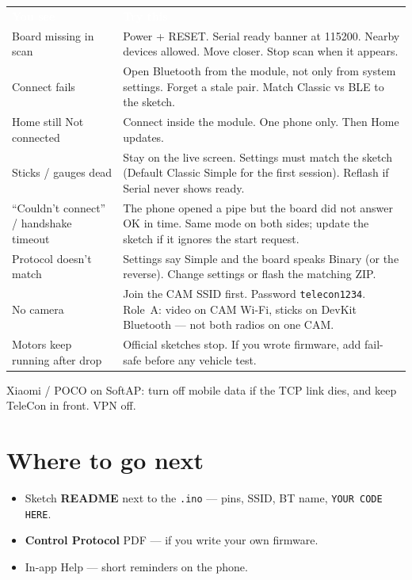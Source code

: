 \documentclass[12pt,a4paper]{article}
\newcommand{\thc}[1]{\textcolor{white}{\bfseries #1}}
\begin{document}
\begin{center}
\renewcommand{\arraystretch}{1.2}
\begin{tabular}{>{\raggedright\arraybackslash}p{3.7cm}
                >{\raggedright\arraybackslash}p{8.5cm}}
\rowcolor{TblHead}
\thc{You see} & \thc{Try this} \\
Board missing in scan &
  Power + RESET. Serial ready banner at 115200.
  Nearby devices allowed. Move closer. Stop scan when it appears. \\
\rowcolor{TblTelem}
Connect fails &
  Open Bluetooth from the module, not only from system settings.
  Forget a stale pair. Match Classic vs BLE to the sketch. \\
Home still Not connected &
  Connect inside the module. One phone only. Then Home updates. \\
\rowcolor{TblSw}
Sticks / gauges dead &
  Stay on the live screen. Settings must match the sketch
  (Default Classic Simple for the first session). Reflash if Serial
  never shows ready. \\
``Couldn't connect'' /
  handshake timeout &
  The phone opened a pipe but the board did not answer OK in time.
  Same mode on both sides; update the sketch if it ignores the start
  request. \\
\rowcolor{TblId}
Protocol doesn't match &
  Settings say Simple and the board speaks Binary (or the reverse).
  Change settings or flash the matching ZIP. \\
No camera &
  Join the CAM SSID first. Password \texttt{telecon1234}.
  Role~A: video on CAM Wi-Fi, sticks on DevKit Bluetooth --- not both
  radios on one CAM. \\
\rowcolor{TblSum}
Motors keep running
  after drop &
  Official sketches stop. If you wrote firmware, add fail-safe before
  any vehicle test. \\
\end{tabular}
\end{center}

Xiaomi / POCO on SoftAP: turn off mobile data if the TCP link dies, and
keep TeleCon in front. VPN off.

\section{Where to go next}
\label{sec:next}

\begin{itemize}[leftmargin=1.4cm]
  \item Sketch \textbf{README} next to the \texttt{.ino} --- pins, SSID,
        BT name, \texttt{YOUR CODE HERE}.
  \item \textbf{Control Protocol} PDF --- if you write your own firmware.
  \item In-app Help --- short reminders on the phone.
\end{itemize}
\end{document}
